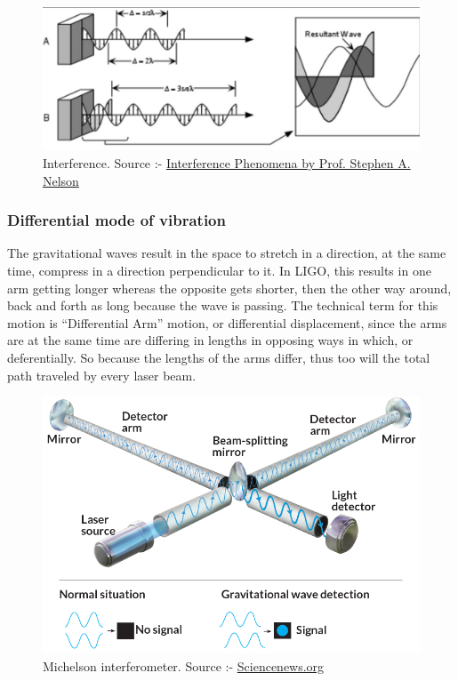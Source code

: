 \begin{figure}[htpb]
    \centering
    \includegraphics[scale=0.585]{images.tex/interference.jpg}
    \caption{Interference. Source :- \href{https://www.tulane.edu/~sanelson/eens211/interference_of_light.htm}{Interference Phenomena by Prof. Stephen A. Nelson}}
\end{figure}

\subsubsection{Differential mode of vibration}

The gravitational waves result in the space to stretch in a direction, at the same time,  compress in a direction perpendicular to it. In LIGO, this results in one arm getting longer whereas the opposite gets shorter, then the other way around, back and forth as long because the wave is passing.  The technical term for this motion is “Differential Arm” motion, or differential displacement, since the arms are at the same time are differing in lengths in opposing ways in which, or deferentially. So because the lengths of the arms differ, thus too will the total path traveled by every laser beam.

\begin{figure}[h]
    \centering
    \includegraphics[scale=0.52]{images.tex/Interferometer.jpg}
    \caption{Michelson interferometer.\; Source :- \href{https://www.sciencenews.org/article/trio-wins-physics-nobel-prize-gravitational-wave-detection}{Sciencenews.org}}
\end{figure}

